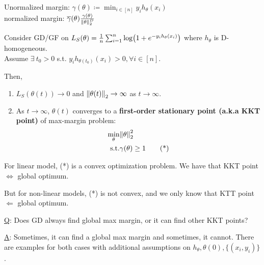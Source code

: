 \begin{definition}
    Unormalized margin: \(\gamma (\theta) \coloneqq \min_{i \in [n]} y_i h_\theta (x_i)\)  \\ 
    normalized margin: \(\overline{\gamma}(\theta) \frac{\gamma (\theta )}{\norm{\theta}_2^D}\)
\end{definition}


\begin{theorem}
    Consider GD/GF on \(L_S (\theta) = \frac{1}{n} \sum_{i=1}^n \log (1 + e^{-y_i h_{\theta}(x_i)})\) where 
    \(h_\theta\) is D-homogeneous.  \\ 
    Assume \(\exists \ t_0 > 0\) s.t. \(y_i h_{\theta (t_0)} (x_i) > 0, \forall i \in [n]\). 

    Then, 
    \begin{enumerate}
        \item \(L_S  \left(\theta(t)\right) \to 0  \) and \(\norm{\theta(t)}_2 \to \infty\) as \(t \to \infty\). 
        \item As \(t \to \infty\), \(\theta(t)\) converges to a \textbf{first-order stationary point (a.k.a KKT point)}
        of max-margin problem: 
        \begin{align*}
            \min_{\theta} &\norm{\theta}_2^2 \\ 
            \text{s.t.} &\gamma (\theta) \geq 1  \tag*{(*)}
        \end{align*}       
    \end{enumerate}
\end{theorem}


\begin{remark}
    For linear model, (*) is a convex optimization problem. We have that KKT point \(\Leftrightarrow\) global optimum.
    
    But for non-linear models, (*) is not convex, and we only know that KTT point \(\Leftarrow\) global optimum. 
\end{remark}


\underline{Q}: Does GD always find global max margin, or it can find other KKT points? 

\underline{A}: Sometimes, it can find a global max margin and sometimes, it cannot. There 
are examples for both cases with additional assumptions on \(h_\theta, \theta(0), \{ (x_i, y_i)\}\). 

